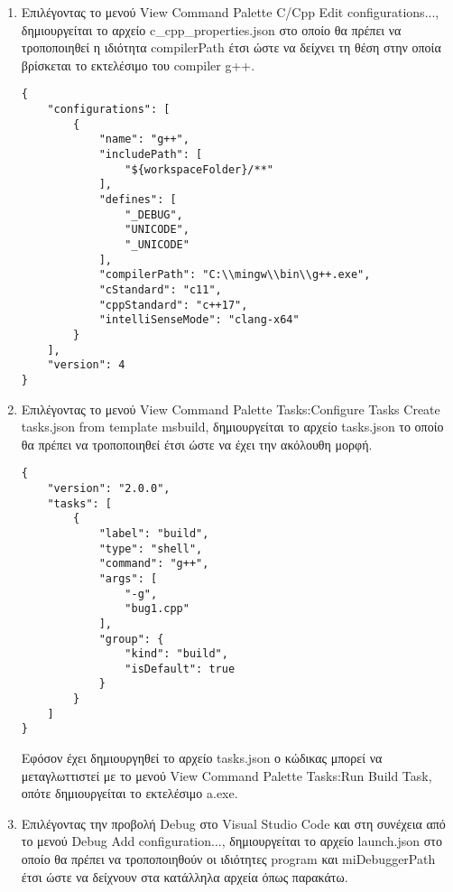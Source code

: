 \begin{enumerate}
\item Επιλέγοντας το μενού View \textrightarrow Command Palette \textrightarrow C/Cpp Edit configurations..., δημιουργείται το αρχείο c\_cpp\_properties.json στο οποίο θα πρέπει να τροποποιηθεί η ιδιότητα compilerPath έτσι ώστε να δείχνει τη θέση στην οποία βρίσκεται το εκτελέσιμο του compiler g++.

\begin{lstlisting}[style=DOS,caption=c\_cpp\_properties.json]
{
    "configurations": [
        {
            "name": "g++",
            "includePath": [
                "${workspaceFolder}/**"
            ],
            "defines": [
                "_DEBUG",
                "UNICODE",
                "_UNICODE"
            ],
            "compilerPath": "C:\\mingw\\bin\\g++.exe",
            "cStandard": "c11",
            "cppStandard": "c++17",
            "intelliSenseMode": "clang-x64"
        }
    ],
    "version": 4
}
\end{lstlisting}

\item Επιλέγοντας το μενού View \textrightarrow Command Palette \textrightarrow Tasks:Configure Tasks \textrightarrow Create tasks.json from template \textrightarrow msbuild, δημιουργείται το αρχείο tasks.json το οποίο θα πρέπει να τροποποιηθεί έτσι ώστε να έχει την ακόλουθη μορφή.

\begin{lstlisting}[style=DOS,caption=tasks.json]
{
    "version": "2.0.0",
    "tasks": [
        {
            "label": "build",
            "type": "shell",
            "command": "g++",
            "args": [
                "-g",
                "bug1.cpp"
            ],
            "group": {
                "kind": "build",
                "isDefault": true
            }
        }
    ]
}
\end{lstlisting}

Εφόσον έχει δημιουργηθεί το αρχείο tasks.json ο κώδικας μπορεί να μεταγλωττιστεί με το  μενού View \textrightarrow Command Palette \textrightarrow Tasks:Run Build Task, οπότε δημιουργείται το εκτελέσιμο a.exe.

\item Επιλέγοντας την προβολή Debug στο Visual Studio Code και στη συνέχεια από το μενού Debug \textrightarrow Add configuration..., δημιουργείται το αρχείο launch.json στο οποίο θα πρέπει να τροποποιηθούν οι ιδιότητες program και miDebuggerPath έτσι ώστε να δείχνουν στα κατάλληλα αρχεία όπως παρακάτω.  


\end{enumerate}
